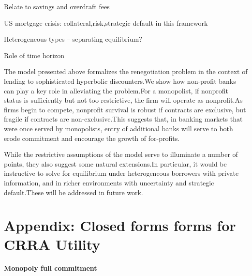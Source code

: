 \documentclass[11pt]{article}%
\providecommand{\DIFdel}[1]{{\protect\color{red} \scriptsize #1}} %
\begin{document}
{%
\DIFdel{Relate to savings and overdraft fees
}%

\DIFdel{US mortgage crisis: collateral,risk,strategic default in this
framework
}%

\DIFdel{Heterogeneous types --}%
\DIFdel{separating equilibrium?
}%

\DIFdel{Role of time horizon
}%


\DIFdel{The model presented above formalizes the renegotiation problem in the
context of lending to sophisticated hyperbolic discounters.We show how
non-profit banks can play a key role in alleviating the problem.For a
monopolist, if nonprofit status is sufficiently but not too restrictive, the
firm will operate as nonprofit.As firms begin to compete, nonprofit
survival is robust if contracts are exclusive, but fragile if contracts are
non-exclusive.This suggests that, in banking markets that were once served
by monopolists, entry of additional banks will serve to both erode
commitment and encourage the growth of for-profits.}%

\DIFdel{While the restrictive assumptions of the model serve to illuminate a number
of points, they also suggest some natural extensions.In particular, it
would be instructive to solve for equilibrium under heterogeneous borrowers
with private information, and in richer environments with uncertainty and
strategic default.These will be addressed in future work.
}%

\section{\DIFdel{Appendix: Closed forms forms for CRRA Utility}}
\addtocounter{section}{-1}%


\paragraph{\DIFdel{Monopoly full commitment}}
\addtocounter{paragraph}{-1}%

}
\end{document}
